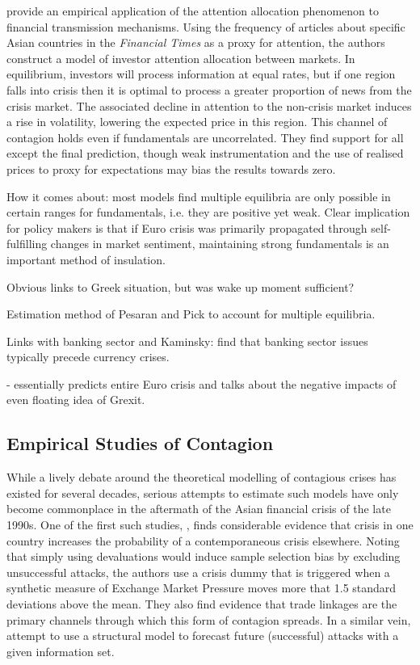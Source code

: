 \documentclass[../base.tex]{subfiles}
\begin{document}
\cite{mondria2013financial} provide an empirical application of the attention allocation phenomenon to financial transmission mechanisms. Using the frequency of articles about specific Asian countries in the \textit{Financial Times} as a proxy for attention, the authors construct a model of investor attention allocation between markets. In equilibrium, investors will process information at equal rates, but if one region falls into crisis then it is optimal to process a greater proportion of news from the crisis market. The associated decline in attention to the non-crisis market induces a rise in volatility, lowering the expected price in this region. This channel of contagion holds even if fundamentals are uncorrelated. They find support for all except the final prediction, though weak instrumentation and the use of realised prices to proxy for expectations may bias the results towards zero. 



How it comes about: most models find multiple equilibria are only possible in certain ranges for fundamentals, i.e. they are positive yet weak. Clear implication for policy makers is that if Euro crisis was primarily propagated through self-fulfilling changes in market sentiment, maintaining strong fundamentals is an important method of insulation. 


Obvious links to Greek situation, but was wake up moment sufficient?

Estimation method of Pesaran and Pick to account for multiple equilibria.

Links with banking sector \cite{alter2012credit} and \cite{kaminsky1999twin}
Kaminsky: find that banking sector issues typically precede currency crises.


\cite{obstfeld1997destabilizing} - essentially predicts entire Euro crisis and talks about the negative impacts of even floating idea of Grexit.

\subsection{Empirical Studies of Contagion}

While a lively debate around the theoretical modelling of contagious crises has existed for several decades, serious attempts to estimate such models have only become commonplace in the aftermath of the Asian financial crisis of the late 1990s. One of the first such studies, \cite{eichengreen1996contagious}, finds considerable evidence that crisis in one country increases the probability of a contemporaneous crisis elsewhere. Noting that simply using devaluations would induce sample selection bias by excluding unsuccessful attacks, the authors use a crisis dummy that is triggered when a synthetic measure of Exchange Market Pressure moves more that 1.5 standard deviations above the mean. They also find evidence that trade linkages are the primary channels through which this form of contagion spreads. In a similar vein, \cite{esquivel1998explaining} attempt to use a structural model to forecast future (successful) attacks with a given information set.
\end{document}
